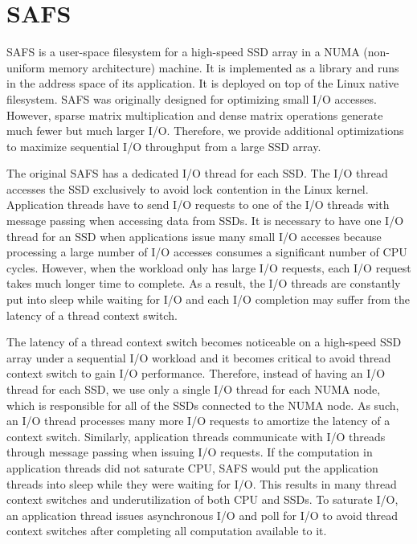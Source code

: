 \section{SAFS}

SAFS \cite{safs} is a user-space filesystem for a high-speed SSD array in
a NUMA (non-uniform memory architecture) machine. It is implemented as
a library and runs in the address space
of its application. It is deployed on top of the Linux native filesystem.
SAFS was originally designed for optimizing small I/O accesses. However,
sparse matrix multiplication and dense matrix operations
generate much fewer but much larger I/O. Therefore, we provide additional
optimizations to maximize sequential I/O throughput from a large SSD array.

The original SAFS has a dedicated I/O thread for each SSD. The I/O thread
accesses the SSD exclusively to avoid lock contention in the Linux kernel.
Application threads have to send I/O requests to one of the I/O threads
with message passing when accessing data from SSDs. It is necessary to have
one I/O thread for
an SSD when applications issue many small I/O accesses because processing
a large number of I/O accesses consumes a significant number of CPU cycles.
However, when the workload only has large I/O requests, each I/O request takes
much longer time to complete. As a result, the I/O threads are constantly put
into sleep while waiting for I/O and each I/O completion may suffer from
the latency of a thread context switch.

The latency of a thread context switch becomes noticeable on a high-speed SSD
array under a sequential I/O workload and it becomes critical to avoid thread
context switch to gain I/O performance. Therefore, instead of having an I/O
thread for each SSD, we use only a single I/O thread for each NUMA node, which
is responsible for all of the SSDs connected to the NUMA node. As such, an I/O
thread processes many more I/O requests to amortize the latency of a context
switch. Similarly, application threads communicate with I/O threads through
message passing when issuing I/O requests. If the computation in application
threads did not saturate CPU, SAFS would put the application threads into
sleep while they were waiting for I/O. This results in many thread context
switches and underutilization of both CPU and SSDs. To saturate I/O,
an application thread issues asynchronous I/O and poll for I/O to avoid thread
context switches after completing all computation available to it.

